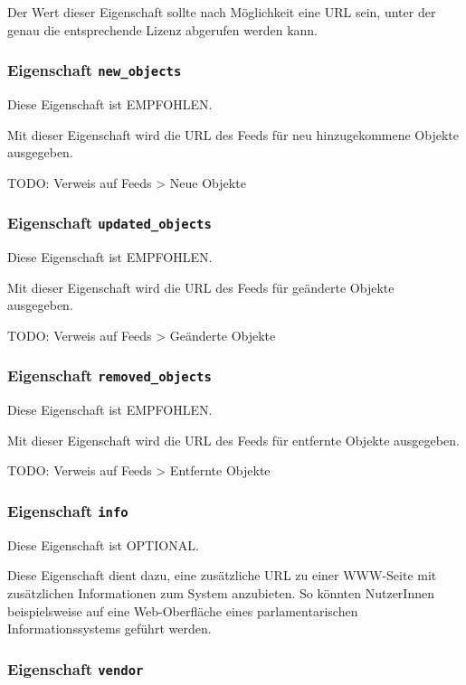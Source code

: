 \documentclass[,a4paper]{article}
\begin{document}
Der Wert dieser Eigenschaft sollte nach Möglichkeit eine URL sein, unter
der genau die entsprechende Lizenz abgerufen werden kann.

\subsubsection{Eigenschaft \texttt{new\_objects}}

Diese Eigenschaft ist EMPFOHLEN.

Mit dieser Eigenschaft wird die URL des Feeds für neu hinzugekommene
Objekte ausgegeben.

TODO: Verweis auf Feeds \textgreater{} Neue Objekte

\subsubsection{Eigenschaft \texttt{updated\_objects}}

Diese Eigenschaft ist EMPFOHLEN.

Mit dieser Eigenschaft wird die URL des Feeds für geänderte Objekte
ausgegeben.

TODO: Verweis auf Feeds \textgreater{} Geänderte Objekte

\subsubsection{Eigenschaft \texttt{removed\_objects}}

Diese Eigenschaft ist EMPFOHLEN.

Mit dieser Eigenschaft wird die URL des Feeds für entfernte Objekte
ausgegeben.

TODO: Verweis auf Feeds \textgreater{} Entfernte Objekte

\subsubsection{Eigenschaft \texttt{info}}

Diese Eigenschaft ist OPTIONAL.

Diese Eigenschaft dient dazu, eine zusätzliche URL zu einer WWW-Seite
mit zusätzlichen Informationen zum System anzubieten. So könnten
NutzerInnen beispielsweise auf eine Web-Oberfläche eines
parlamentarischen Informationssystems geführt werden.

\subsubsection{Eigenschaft \texttt{vendor}}
\end{document}
